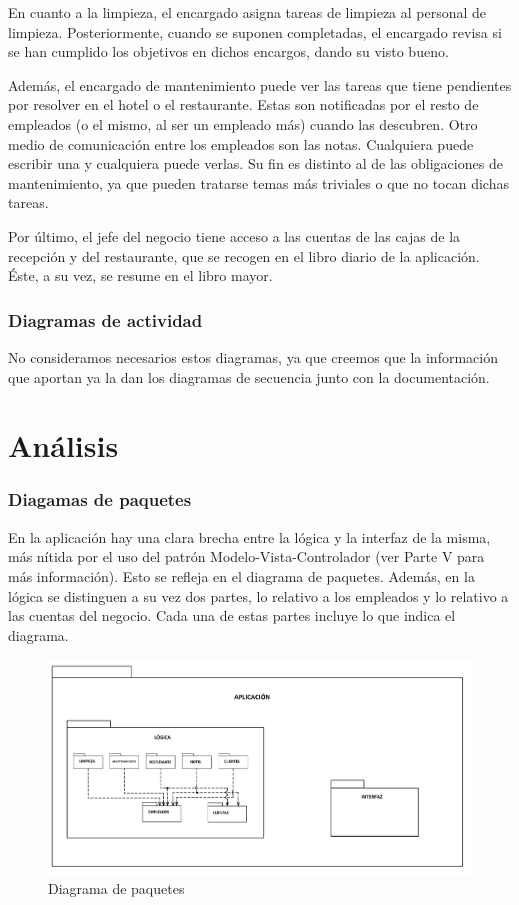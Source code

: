\documentclass[spanish,a4paper,11pt, twoside]{report}	%
\begin{document}
	En cuanto a la limpieza, el encargado asigna tareas de limpieza al personal de limpieza. Posteriormente, cuando se suponen completadas, el encargado revisa si se han cumplido los objetivos en dichos encargos, dando su visto bueno.

	Además, el encargado de mantenimiento puede ver las tareas que tiene pendientes por resolver en el hotel o el restaurante. Estas son notificadas por el resto de empleados (o el mismo, al ser un empleado más) cuando las descubren. Otro medio de comunicación entre los empleados son las notas. Cualquiera puede escribir una y cualquiera puede verlas. Su fin es distinto al de las obligaciones de mantenimiento, ya que pueden tratarse temas más triviales o que no tocan dichas tareas.
		
	Por último, el jefe del negocio tiene acceso a las cuentas de las cajas de la recepción y del restaurante, que se recogen en el libro diario de la aplicación. Éste, a su vez, se resume en el libro mayor.




	\section{Diagramas de actividad}
	No consideramos necesarios estos diagramas, ya que creemos que la información que aportan ya la dan los diagramas de secuencia junto con la documentación.



\setcounter{section}{0}
\part{Análisis}
	\section{Diagamas de paquetes}
	En la aplicación hay una clara brecha entre la lógica y la interfaz de la misma, más nítida por el uso del patrón Modelo-Vista-Controlador (ver Parte V para más información). Esto se refleja en el diagrama de paquetes. Además, en la lógica se distinguen a su vez dos partes, lo relativo a los empleados y lo relativo a las cuentas del negocio. Cada una de estas partes incluye lo que indica el diagrama.
	\begin{figure}[!h]
	\centering
	\includegraphics[scale=0.15]{diagramadepaquetes.png}	
	\caption{Diagrama de paquetes}
	\end{figure}
\end{document}
